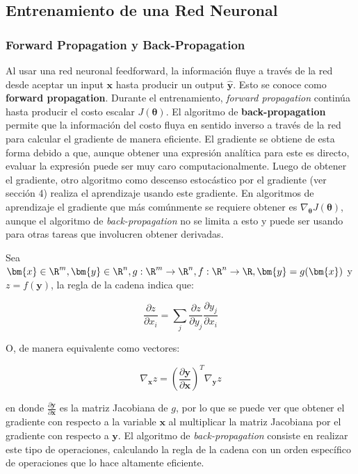 \subsection{Entrenamiento de una Red Neuronal}

\subsubsection{Forward Propagation y Back-Propagation}

Al usar una red neuronal feedforward, la informaci\'on fluye a trav\'es de la red desde aceptar un input $\bm{x}$ hasta producir un output $\hat{\bm{y}}$. Esto se conoce como \textbf{forward propagation}. Durante el entrenamiento, \textit{forward propagation} contin\'ua hasta producir el costo escalar $J(\bm{\theta})$. El algoritmo de \textbf{back-propagation} permite que la informaci\'on del costo fluya en sentido inverso a trav\'es de la red para calcular el gradiente de manera eficiente. El gradiente se obtiene de esta forma debido a que, aunque obtener una expresi\'on anal\'itica para este es directo, evaluar la expresi\'on puede ser muy caro computacionalmente. Luego de obtener el gradiente, otro algoritmo como descenso estoc\'astico por el gradiente (ver secci\'on 4) realiza el aprendizaje usando este gradiente. En algoritmos de aprendizaje el gradiente que m\'as com\'unmente se requiere obtener es $\nabla_{\bm{\theta}}J(\bm{\theta})$, aunque el algoritmo de \textit{back-propagation} no se limita a esto y puede ser usando para otras tareas que involucren obtener derivadas.

Sea $\bm{x} \in \R^{m}, \bm{y} \in \R^{n}, g:\R^{m} \rightarrow \R^{n}, f:\R^{n} \rightarrow \R, \bm{y} = g(\bm{x})$ y $z = f(\bm{y})$, la regla de la cadena indica que:

\begin{equation}
\frac{\partial z}{\partial x_{i}} = \sum_{j}\frac{\partial z}{\partial y_{j}}\frac{\partial y_{j}}{\partial x_{i}}
\end{equation}

O, de manera equivalente como vectores:

\begin{equation}
\nabla_{\bm{x}}z = (\frac{\partial \bm{y}}{\partial \bm{x}})^{T}\nabla_{\bm{y}}z
\end{equation}

en donde $\frac{\partial \bm{y}}{\partial \bm{x}}$ es la matriz Jacobiana de $g$, por lo que se puede ver que obtener el gradiente con respecto a la variable $\bm{x}$ al multiplicar la matriz Jacobiana por el gradiente con respecto a $\bm{y}$. El algoritmo de \textit{back-propagation} consiste en realizar este tipo de operaciones, calculando la regla de la cadena con un orden espec\'ifico de operaciones que lo hace altamente eficiente.

